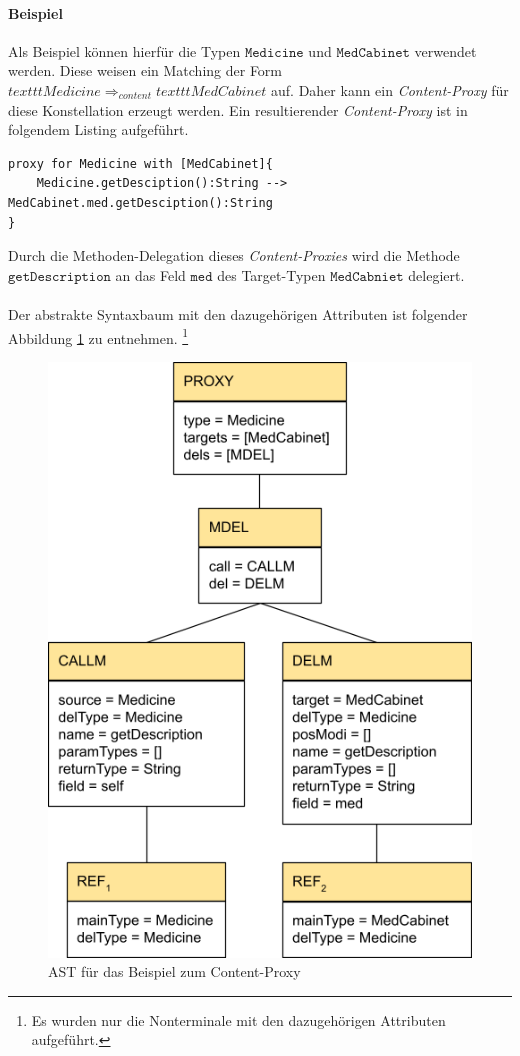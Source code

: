 \documentclass[a4paper,12pt]{article}
\begin{document}
\paragraph{Beispiel} Als Beispiel können hierfür die Typen $\texttt{Medicine}$ und $\texttt{MedCabinet}$ verwendet werden. Diese weisen ein Matching der Form $texttt{Medicine} \Rightarrow_{content} texttt{MedCabinet}$ auf. Daher kann ein \emph{Content-Proxy} für diese Konstellation erzeugt werden. Ein resultierender \emph{Content-Proxy} ist in folgendem Listing aufgeführt.
\begin{lstlisting}[style = dsl]
proxy for Medicine with [MedCabinet]{
	Medicine.getDesciption():String --> MedCabinet.med.getDesciption():String
}
\end{lstlisting}
Durch die Methoden-Delegation dieses \emph{Content-Proxies} wird die Methode $\texttt{getDescription}$ an das Feld $\texttt{med}$ des Target-Typen $\texttt{MedCabniet}$ delegiert.\\\\
Der abstrakte Syntaxbaum mit den dazugehörigen Attributen ist folgender Abbildung \ref{fig:ASTCONTENT} zu entnehmen. \footnote{Es wurden nur die Nonterminale mit den dazugehörigen Attributen aufgeführt.}
\begin{figure}[h!]
\centering
\includegraphics[width=0.5\linewidth]{AST_ContentExample}
\caption{AST für das Beispiel zum Content-Proxy}
\label{fig:ASTCONTENT}
\end{figure}
\noindent
\end{document}
